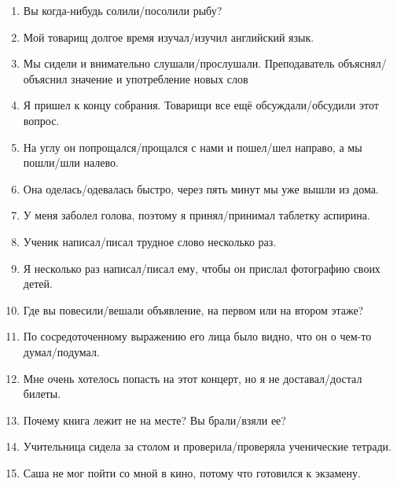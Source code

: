 \documentclass[paper=a4, fontsize=11pt]{scrartcl}
\begin{document}
\begin{enumerate}
    \item Вы когда-нибудь солили/посолили рыбу?
    \item Мой товарищ долгое время изучал/изучил английский язык.
    \item Мы сидели и внимательно слушали/прослушали. Преподаватель объяснял/объяснил значение и употребление новых слов
    \item Я пришел к концу собрания. Товарищи все ещё обсуждали/обсудили этот вопрос.
    \item На углу он попрощался/прощался с нами и пошел/шел направо, а мы пошли/шли налево.
    \item Она оделась/одевалась быстро, через пять минут мы уже вышли из дома.
    \item У меня заболел голова, поэтому я принял/принимал таблетку аспирина.
    \item Ученик написал/писал трудное слово несколько раз.
    \item Я несколько раз написал/писал ему, чтобы он прислал фотографию своих детей.
    \item Где вы повесили/вешали объявление, на первом или на втором этаже?
    \item По сосредоточенному выражению его лица было видно, что он о чем-то думал/подумал.
    \item Мне очень хотелось попасть на этот концерт, но я не доставал/достал билеты.
    \item Почему книга лежит не на месте? Вы брали/взяли ее?
    \item Учительница сидела за столом и проверила/проверяла ученические тетради.
    \item Саша не мог пойти со мной в кино, потому что готовился к экзамену.
\end{enumerate}
\end{document}
